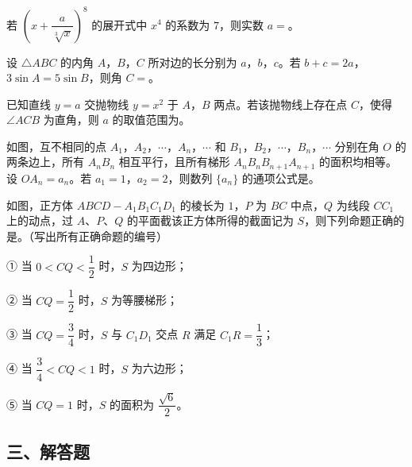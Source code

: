 \begin{question}
若 $\left(x+\dfrac{a}{\sqrt[3]{x}}\right)^8$ 的展开式中 $x^4$ 的系数为 $7$，则实数 $a=$\gkblank{}。

\end{question}
\begin{question}
设 $\triangle ABC$ 的内角 $A$，$B$，$C$ 所对边的长分别为 $a$，$b$，$c$。若 $b+c=2a$，$3\sin A=5\sin B$，则角 $C=$\gkblank{}。

\end{question}
\begin{question}
已知直线 $y=a$ 交抛物线 $y=x^2$ 于 $A$，$B$ 两点。若该抛物线上存在点 $C$，使得 $\angle ACB$ 为直角，则 $a$ 的取值范围为\gkblank{}。

\Needspace{0.4\textheight}
\end{question}
\begin{question}
如图，互不相同的点 $A_1$，$A_2$，$\cdots$，$A_n$，$\cdots$ 和 $B_1$，$B_2$，$\cdots$，$B_n$，$\cdots$ 分别在角 $O$ 的两条边上，所有 $A_nB_n$ 相互平行，且所有梯形 $A_nB_nB_{n+1}A_{n+1}$ 的面积均相等。设 $OA_n=a_n$。若 $a_1=1$，$a_2=2$，则数列 $\{a_n\}$ 的通项公式是\gkblank{}。
\nopagebreak[4]
\begin{center}\end{center}
\nopagebreak[4]
\Needspace{0.4\textheight}
\end{question}
\begin{question}
如图，正方体 $ABCD-A_1B_1C_1D_1$ 的棱长为 $1$，$P$ 为 $BC$ 中点，$Q$ 为线段 $CC_1$ 上的动点，过 $A$、$P$、$Q$ 的平面截该正方体所得的截面记为 $S$，则下列命题正确的是\gkblank{}。（写出所有正确命题的编号）
\nopagebreak[4]
\begin{center}\end{center}
\nopagebreak[4]
① 当 $0<CQ<\dfrac12$ 时，$S$ 为四边形；

② 当 $CQ=\dfrac12$ 时，$S$ 为等腰梯形；

③ 当 $CQ=\dfrac34$ 时，$S$ 与 $C_1D_1$ 交点 $R$ 满足 $C_1R=\dfrac13$；

④ 当 $\dfrac34<CQ<1$ 时，$S$ 为六边形；

⑤ 当 $CQ=1$ 时，$S$ 的面积为 $\dfrac{\sqrt6}{2}$。

\end{question}
\begingroup
\renewcommand{\gkpart}[1]{\Needspace{0.2\textheight}\subsection*{#1}\nopagebreak}
\gkpart{三、解答题}
\endgroup

